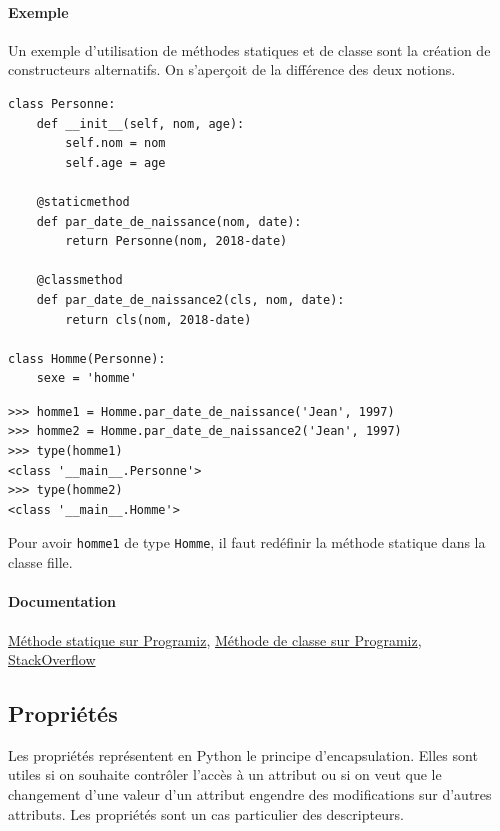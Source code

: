 \documentclass[a4paper, 10pt]{article}
\newcommand{\code}[1]{{\small\texttt{#1}}}
\begin{document}
\paragraph{Exemple} Un exemple d'utilisation de méthodes statiques et de classe sont la création de constructeurs alternatifs. On s'aperçoit de la différence des deux notions.
\begin{verbatim}
class Personne:
    def __init__(self, nom, age):
        self.nom = nom
        self.age = age

    @staticmethod
    def par_date_de_naissance(nom, date):
        return Personne(nom, 2018-date)

    @classmethod
    def par_date_de_naissance2(cls, nom, date):
        return cls(nom, 2018-date)

class Homme(Personne):
    sexe = 'homme'
\end{verbatim}
\begin{Verbatim}[frame=single, fontsize=\footnotesize]
>>> homme1 = Homme.par_date_de_naissance('Jean', 1997)
>>> homme2 = Homme.par_date_de_naissance2('Jean', 1997)
>>> type(homme1)
<class '__main__.Personne'>
>>> type(homme2)
<class '__main__.Homme'>
\end{Verbatim}

Pour avoir \code{homme1} de type \code{Homme}, il faut redéfinir la méthode statique dans la classe fille.

\paragraph{Documentation} \href{https://www.programiz.com/python-programming/methods/built-in/staticmethod}{Méthode statique sur Programiz}, \href{https://www.programiz.com/python-programming/methods/built-in/classmethod}{Méthode de classe sur Programiz}, \href{https://stackoverflow.com/questions/136097/what-is-the-difference-between-staticmethod-and-classmethod-in-python/1669524#1669524}{StackOverflow}


\subsection{Propriétés}
 Les propriétés représentent en Python le principe d'encapsulation. Elles sont utiles si on souhaite contrôler l'accès à un attribut ou si on veut que le changement d'une valeur d'un attribut engendre des modifications sur d'autres attributs. Les propriétés sont un cas particulier des descripteurs.
\end{document}
